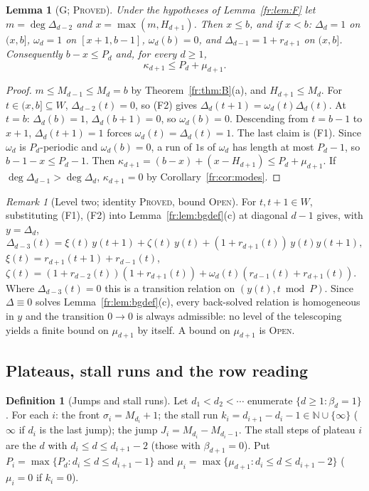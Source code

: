 \documentclass[11pt]{article}
\newtheorem{lemma}[theorem]{Lemma}
\theoremstyle{definition}
\newtheorem{definition}[theorem]{Definition}
\theoremstyle{remark}
\newtheorem{remark}[theorem]{Remark}
\newcommand{\N}{\mathbb{N}}
\newcommand{\PROVED}{\textsc{Proved}}
\newcommand{\OPEN}{\textsc{Open}}
\begin{document}
\begin{lemma}[G; \PROVED]\label{fr:lem:G}
Under the hypotheses of Lemma~\ref{fr:lem:F} let $m=\deg\Delta_{d-2}$ and $x=\max(m,H_{d+1})$.
Then $x\le b$, and if $x<b$:
$\Delta_d=1$ on $(x,b]$, $\omega_d=1$ on $[x+1,b-1]$, $\omega_d(b)=0$, and
$\Delta_{d-1}=1+r_{d+1}$ on $(x,b]$. Consequently $b-x\le P_d$ and, for every $d\ge1$,
\[
\kappa_{d+1}\le P_d+\mu_{d+1}.
\]
\end{lemma}
\begin{proof}
$m\le M_{d-1}\le M_d=b$ by Theorem~\ref{fr:thm:B}(a), and $H_{d+1}\le M_d$.
For $t\in(x,b]\subseteq W$, $\Delta_{d-2}(t)=0$, so (F2) gives $\Delta_d(t+1)=\omega_d(t)\Delta_d(t)$.
At $t=b$: $\Delta_d(b)=1$, $\Delta_d(b+1)=0$, so $\omega_d(b)=0$. Descending from $t=b-1$ to $x+1$,
$\Delta_d(t+1)=1$ forces $\omega_d(t)=\Delta_d(t)=1$. The last claim is (F1).
Since $\omega_d$ is $P_d$-periodic and $\omega_d(b)=0$, a run of $1$s of $\omega_d$ has length at most
$P_d-1$, so $b-1-x\le P_d-1$. Then $\kappa_{d+1}=(b-x)+(x-H_{d+1})\le P_d+\mu_{d+1}$.
If $\deg\Delta_{d-1}>\deg\Delta_d$, $\kappa_{d+1}=0$ by Corollary~\ref{fr:cor:modes}.
\end{proof}

\begin{remark}[Level two; identity \PROVED, bound \OPEN]\label{fr:rem:level2}
For $t,t+1\in W$, substituting (F1), (F2) into Lemma~\ref{fr:lem:bgdef}(c) at diagonal $d-1$ gives,
with $y=\Delta_d$,
\[
\Delta_{d-3}(t)=\xi(t)\,y(t+1)+\zeta(t)\,y(t)+(1+r_{d+1}(t))\,y(t)y(t+1),
\]
$\xi(t)=r_{d+1}(t+1)+r_{d-1}(t)$,
$\zeta(t)=(1+r_{d-2}(t))(1+r_{d+1}(t))+\omega_d(t)(r_{d-1}(t)+r_{d+1}(t))$.
Where $\Delta_{d-3}(t)=0$ this is a transition relation on $(y(t),t\bmod P)$. Since
$\Delta\equiv0$ solves Lemma~\ref{fr:lem:bgdef}(c), every back-solved relation is homogeneous in $y$ and the
transition $0\to0$ is always admissible: no level of the telescoping yields a finite bound on
$\mu_{d+1}$ by itself. A bound on $\mu_{d+1}$ is \OPEN.
\end{remark}

\subsection{Plateaus, stall runs and the row reading}

\begin{definition}[Jumps and stall runs]\label{fr:def:jumps}
Let $d_1<d_2<\cdots$ enumerate $\{d\ge1:\beta_d=1\}$. For each $i$:
the front $\sigma_i=M_{d_i}+1$; the stall run $k_i=d_{i+1}-d_i-1\in\N\cup\{\infty\}$
($\infty$ if $d_i$ is the last jump); the jump $J_i=M_{d_i}-M_{d_i-1}$.
The stall steps of plateau $i$ are the $d$ with $d_i\le d\le d_{i+1}-2$ (those with $\beta_{d+1}=0$).
Put $P_i=\max\{P_d:d_i\le d\le d_{i+1}-1\}$ and $\mu_i=\max\{\mu_{d+1}:d_i\le d\le d_{i+1}-2\}$
($\mu_i=0$ if $k_i=0$).
\end{definition}
\end{document}
